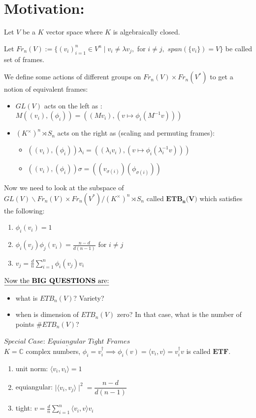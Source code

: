 
\section{Motivation:}

Let $ V $ be a $ K $ vector space where $ K $ is algebraically closed.
\begin{definition}
	Let $ Fr_n(V) := \{(v_i)_{i=1}^{n} \in V^n \mid v_i\ne \lambda v_j, $ for  $i\ne j, $  $span(\{v_i\})=V \} $ be called set of frames.
\end{definition} 

We define some actions of different groups on $ Fr_n(V)\times Fr_n(V^*) $ to get a notion of equivalent frames:

\begin{itemize}
	\item $ GL(V) $ acts on the left as : $ M((v_i),(\phi_i)) = ((Mv_i),(v \mapsto \phi_i(M^{-1}v))) $
	\item $ (K^\times)^n\rtimes S_n $ acts on the right as (scaling and permuting frames): \begin{itemize}
		\item $ ((v_i),(\phi_i))\lambda_i = ((\lambda_i v_i), (v\mapsto\phi_i(\lambda_i^{-1}v)))$
		\item $ ((v_i),(\phi_i))\sigma= ((v_{\sigma(i)})(\phi_{\sigma(i)})) $
	\end{itemize} 
\end{itemize}

\begin{definition}
	Now we need to look at the subspace of $ GL(V) \backslash Fr_n(V)\times Fr_n(V^*) / (K^\times)^n\rtimes S_n $ called {$ \textbf{ETB}_\textbf{n}\textbf{(V)} $} which satisfies the following:
	\begin{enumerate}
		\item $ \phi_i(v_i)=1 $
		\item $ \phi_i(v_j)\phi_j(v_i) =\frac{n-d}{d(n-1)} $ for $ i\ne j $
		\item $ v_j = \frac{d}{n} \sum\limits_{i=1}^{n} \phi_i(v_j)v_i $
	\end{enumerate}
\end{definition}
\noindent
$\underline{\text{Now the \textbf{BIG QUESTIONS} are:}}$ 
\begin{itemize}
	\item what is $ ETB_n(V) $? Variety? 
	\item when is dimension of $ ETB_n(V)$ zero? In that case, what is the number of points $ \# ETB_n(V) $?
\end{itemize}
\pagebreak
\noindent
$\underline{\textit{Special Case: Equiangular Tight Frames}}$\\

$ K = \mathbb{C}$ complex numbers, $\phi_i= v_i^\dagger \implies\phi_i(v) = \langle v_i,v \rangle= v_i^\dagger v $  is called $ \textbf{ETF} $.
\begin{enumerate}
	\item unit norm: $ \langle v_i,v_i\rangle =1 $
	\item equiangular: $ \mid \langle v_i,v_j\rangle \mid ^2 = \dfrac{n-d}{d(n-1)}  $ 
	\item tight: $ v = \frac{d}{n}\sum\limits_{i=1}^n \langle v_i,v \rangle v_i $
\end{enumerate}

